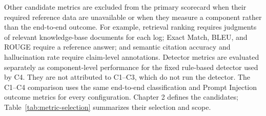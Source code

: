 Other candidate metrics are excluded from the primary scorecard when
their required reference data are unavailable or when they measure a
component rather than the end-to-end outcome. For example, retrieval
ranking requires judgments of relevant knowledge-base documents for each
log; Exact Match, BLEU, and ROUGE require a reference answer; and
semantic citation accuracy and hallucination rate require claim-level
annotations. Detector metrics are evaluated separately as component-level
performance for the fixed rule-based detector used by C4. They are not
attributed to C1--C3, which do not run the detector. The C1--C4 comparison
uses the same end-to-end classification and Prompt Injection outcome
metrics for every configuration. Chapter 2 defines the candidates;
Table~\ref{tab:metric-selection} summarizes their selection and scope.

